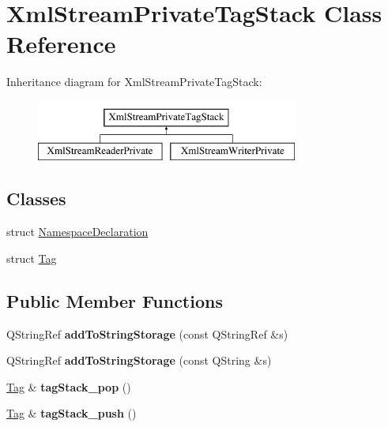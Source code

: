 \hypertarget{class_xml_stream_private_tag_stack}{}\section{Xml\+Stream\+Private\+Tag\+Stack Class Reference}
\label{class_xml_stream_private_tag_stack}
Inheritance diagram for Xml\+Stream\+Private\+Tag\+Stack\+:\begin{figure}[H]
\begin{center}
\leavevmode
\includegraphics[height=2.000000cm]{class_xml_stream_private_tag_stack}
\end{center}
\end{figure}
\subsection*{Classes}
\begin{DoxyCompactItemize}
\item 
struct \hyperlink{struct_xml_stream_private_tag_stack_1_1_namespace_declaration}{Namespace\+Declaration}
\item 
struct \hyperlink{struct_xml_stream_private_tag_stack_1_1_tag}{Tag}
\end{DoxyCompactItemize}
\subsection*{Public Member Functions}
\begin{DoxyCompactItemize}
\item 
\mbox{\label{class_xml_stream_private_tag_stack_a9183cb663016a39f6ac02802be3ede34}} 
Q\+String\+Ref {\bfseries add\+To\+String\+Storage} (const Q\+String\+Ref \&s)
\item 
\mbox{\label{class_xml_stream_private_tag_stack_a98d4ca2823dbb67bbc62bef30c6680a0}} 
Q\+String\+Ref {\bfseries add\+To\+String\+Storage} (const Q\+String \&s)
\item 
\mbox{\label{class_xml_stream_private_tag_stack_ac23bbd67ce08c0e0832ff96417b4c000}} 
\hyperlink{struct_xml_stream_private_tag_stack_1_1_tag}{Tag} \& {\bfseries tag\+Stack\+\_\+pop} ()
\item 
\mbox{\label{class_xml_stream_private_tag_stack_a338207031cbeeb18f79a22ba37a253a2}} 
\hyperlink{struct_xml_stream_private_tag_stack_1_1_tag}{Tag} \& {\bfseries tag\+Stack\+\_\+push} ()
\end{DoxyCompactItemize}
